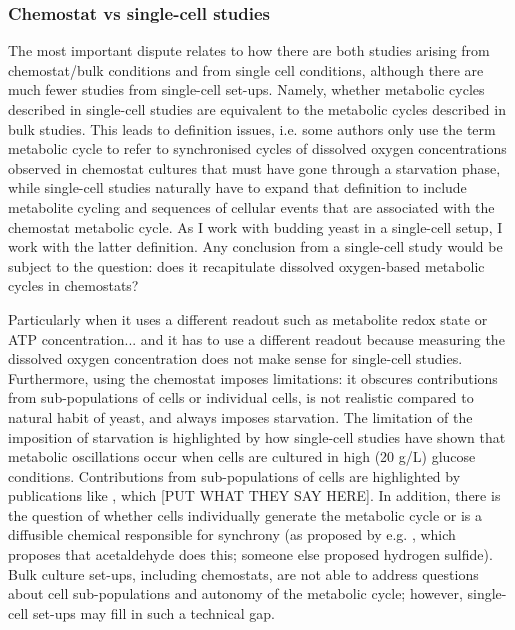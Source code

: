 \subsubsection{Chemostat vs single-cell studies}
\label{subsubsec:intro-ymc-unresolved-chemostat_singlecell}

The most important dispute relates to how there are both studies arising from chemostat/bulk conditions and from single cell conditions,
although there are much fewer studies from single-cell set-ups.
Namely, whether metabolic cycles described in single-cell studies are equivalent to the metabolic cycles described in bulk studies.
This leads to definition issues, i.e. some authors \parencite{laxmanBehaviorMetabolicCycling2010, caustonMetabolicRhythmsFramework2018} only use the term metabolic cycle to refer to synchronised cycles of dissolved oxygen concentrations observed in chemostat cultures that must have gone through a starvation phase, while single-cell studies \parencite{baumgartnerFlavinbasedMetabolicCycles2018, zylstraMetabolicDynamicsCell2022} naturally have to expand that definition to include metabolite cycling and sequences of cellular events that are associated with the chemostat metabolic cycle.
As I work with budding yeast in a single-cell setup, I work with the latter definition.
Any conclusion from a single-cell study would be subject to the question: does it recapitulate dissolved oxygen-based metabolic cycles in chemostats?

Particularly when it uses a different readout such as metabolite redox state or ATP concentration... and it has to use a different readout because measuring the dissolved oxygen concentration does not make sense for single-cell studies.
Furthermore, using the chemostat imposes limitations: it obscures contributions from sub-populations of cells or individual cells, is not realistic compared to natural habit of yeast, and always imposes starvation.
The limitation of the imposition of starvation is highlighted by how single-cell studies have shown that metabolic oscillations occur when cells are cultured in high (20 g/L) glucose conditions.
Contributions from sub-populations of cells are highlighted by publications like \citet{burnettiCellCycleStart2016}, which [PUT WHAT THEY SAY HERE].
In addition, there is the question of whether cells individually generate the metabolic cycle or is a diffusible chemical responsible for synchrony (as proposed by e.g. \citet{krishnaMinimalPushPull2018}, which proposes that acetaldehyde does this; someone else proposed hydrogen sulfide).
Bulk culture set-ups, including chemostats, are not able to address questions about cell sub-populations and autonomy of the metabolic cycle; however, single-cell set-ups may fill in such a technical gap.

